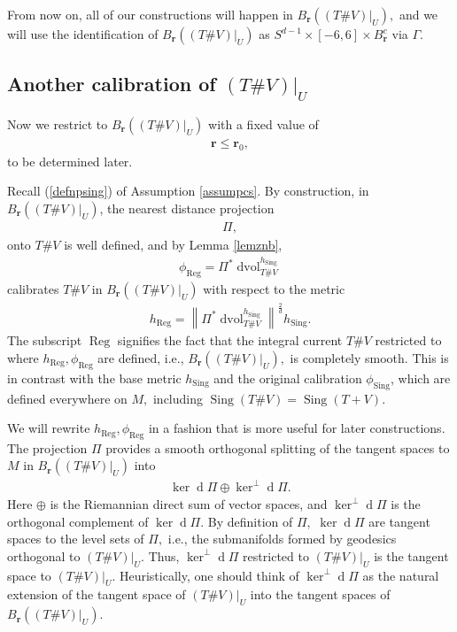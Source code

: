 \documentclass[11pt,a4paper]{amsart}
\numberwithin{equation}{section}
\newcommand{\reg}{{\operatorname{Reg}}}
\newcommand{\sing}{{\operatorname{Sing}}}
\newcommand{\Ga}{\Gamma}
\newcommand{\cp}{^\complement}
\newcommand{\kn}{\ker^\perp \ed\Pi}
\newcommand{\no}[1]{\left\lVert#1\right\rVert}
\newcommand{\dvol}{\operatorname{dvol}}
\newcommand{\ed}{{\operatorname{d}}}
\newcommand{\du}{^\ast}
\newcommand{\mfr}{{\mathbf{r}}}
\newcommand{\tvu}{(T\#V)|_U}
\newcommand{\ur}{B_{\mfr}(\tvu)}
\theoremstyle{plain}
\theoremstyle{definition}
\numberwithin{equation}{subsection}
\begin{document}
	From now on, all of our constructions will happen in $B_\mfr(\tvu),$ and we will use the identification of $B_\mfr(\tvu)$ as $S^{d-1}\times [-6,6]\times B_\mfr^c$ via $\Ga.$
	\subsection{Another calibration of $\tvu$}Now we restrict to $\ur$ with a fixed value of \begin{align}
		\mfr\le \mfr_0,\label{mfr0}
	\end{align} to be determined later.
	
	Recall (\ref{defnpsing}) of Assumption \ref{assumpcs}. By construction, in $B_\mfr(\tvu)$, the nearest distance projection \begin{align*}
		\Pi,
	\end{align*}onto $T\# V$ 
	is well defined, and by Lemma \ref{lemznb}, 
	\begin{align*}
		\phi_\reg=\Pi\du\dvol_{T\# V}^{h_\sing}
	\end{align*}
	calibrates $T\# V$ in $\ur$ with respect to the metric
	\begin{align*}
		h_\reg=\no{	\Pi\du\dvol_{T\# V}^{h_\sing}}^{\frac{2}{d}}h_\sing.
	\end{align*}
	The subscript $\reg$ signifies the fact that the integral current $T\# V$ restricted to where $h_\reg,\phi_\reg$ are defined, i.e., $\ur,$ is completely smooth. This is in contrast with the base metric $h_\sing$ and the original calibration $\phi_\sing$, which are defined everywhere on $M,$ including $\sing (T\# V)=\sing(T+V).$
	
	We will rewrite $h_\reg,\phi_\reg$ in a fashion that is more useful for later constructions. The projection ${\Pi}$ provides a smooth orthogonal splitting of the tangent spaces to $M$ in $\ur$ into
	\begin{align}\label{split}
		\ker \ed\Pi\oplus \ker^\perp \ed\Pi.
	\end{align}
	Here $\oplus$ is the Riemannian direct sum of vector spaces, and $\ker^\perp \ed\Pi$ is the orthogonal complement of $\ker \ed\Pi.$ By definition of $\Pi,$ $\ker\ed\Pi$ are tangent spaces to the level sets of $\Pi,$ i.e., the submanifolds formed by geodesics orthogonal to $\tvu.$ Thus, $\kn$ restricted to $\tvu$
	is the tangent space to $\tvu$. Heuristically, one should think of $\kn$ as the natural extension of the tangent space of $\tvu$ into the tangent spaces of $\ur$.
	
\end{document}
